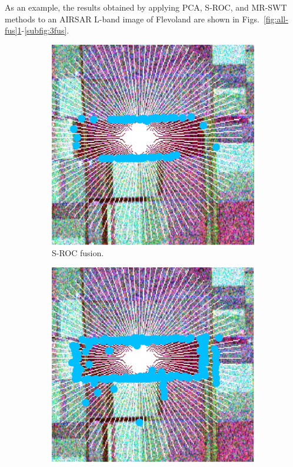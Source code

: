 \documentclass{article}
\begin{document}
As an example, the results obtained by applying PCA, S-ROC, and MR-SWT methods to an AIRSAR L-band image of Flevoland are shown in Figs.~\ref{fig:all-fus}\ref{subfig:1fus}-\ref{subfig:3fus}.
\begin{figure}[hbt]
    \begin{subfigure}{0.32\linewidth}
    \centering
    \includegraphics[width=\linewidth]{figures/roc.pdf}
    \caption{S-ROC fusion.}
    \label{subfig:1fus}
  \end{subfigure}
  \begin{subfigure}{0.33\linewidth}
    \centering
    \includegraphics[width=\linewidth]{figures/pca_1.pdf}

\end{subfigure}
\end{figure}
\end{document}
